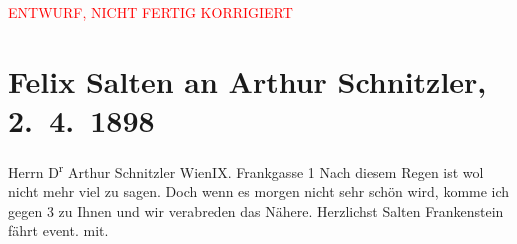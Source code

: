 
\begin{center}
            \textcolor{red}{ENTWURF, NICHT FERTIG KORRIGIERT}
                      \end{center}
            
         
         \renewcommand{\erwaehntePersonen}{Personen: Clemens von Franckenstein}
         \renewcommand{\erwaehnteOrte}{Orte: Frankgasse, Wien}
         \renewcommand{\erwaehnteWerke}{}
               \section[Felix Salten an Arthur Schnitzler, 2. 4. 1898]{ Felix Salten an Arthur Schnitzler, 2. 4. 1898}\nopagebreak{}\rehead{ }\begin{ledgroupsized}[t]{13cm}\normalsize\beginnumbering \toendnotes[C]{\smallbreak\pagebreak[2]} 
\pstart{}{\pb}Herrn D\textsuperscript{r} Arthur Schnitzler \pend{}\pstart{}Wien\pend{}\pstart{}IX. Frankgasse 1\pend{}{\bigskip}\pstart
           \noindent{}{\pb}Nach diesem Regen ist wol nicht
               mehr viel zu sagen. Doch wenn es morgen nicht sehr schön wird, komme ich gegen
                  3 zu Ihnen und wir verabreden das Nähere.\pend
           \pstart  Herzlichst \spacefill\mbox{Salten}\pend{}\pstart
           \noindent{}Frankenstein fährt event. mit.\pend
           
         
         \endnumbering{}\end{ledgroupsized}\begin{anhang}\end{anhang}\newcommand{\dateiname}{L03277}\newcommand{\titel}{Felix Salten an Arthur Schnitzler, 2. 4. 1898}\newcommand{\editorInnen}{Martin Anton Müller und Laura Untner}
      